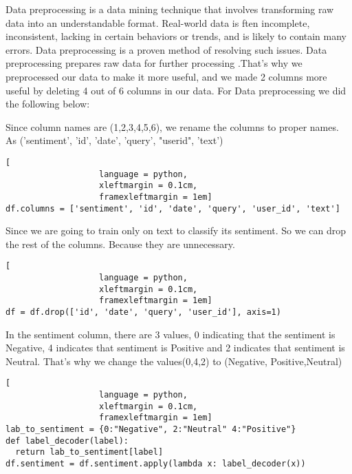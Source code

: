 

Data preprocessing is a data mining technique that involves transforming raw data into an understandable format. Real-world data is ften incomplete, inconsistent, lacking in certain behaviors or trends, and is likely to contain many errors. Data preprocessing is a proven method of resolving such issues. Data preprocessing prepares raw data for further processing .That's why we preprocessed our data to make it more useful, and we made 2 columns more useful by deleting 4 out of 6 columns in our data.
For Data preprocessing we did the following below:


Since column names are (1,2,3,4,5,6), we rename the columns to proper names. As ('sentiment', 'id', 'date', 'query', "userid", 'text')

\begin{lstlisting}[
                   language = python,
                   xleftmargin = 0.1cm,
                   framexleftmargin = 1em]
df.columns = ['sentiment', 'id', 'date', 'query', 'user_id', 'text']
\end{lstlisting}

Since we are going to train only on text to classify its sentiment. So we can drop the rest of the columns. Because they are unnecessary.

\begin{lstlisting}[
                   language = python,
                   xleftmargin = 0.1cm,
                   framexleftmargin = 1em]
df = df.drop(['id', 'date', 'query', 'user_id'], axis=1)
\end{lstlisting}

In the sentiment column, there are 3 values, 0 indicating that the sentiment is Negative, 4 indicates that sentiment is Positive and 2 indicates that sentiment is Neutral. That's why we change the values(0,4,2) to (Negative, Positive,Neutral)
\begin{lstlisting}[
                   language = python,
                   xleftmargin = 0.1cm,
                   framexleftmargin = 1em]
lab_to_sentiment = {0:"Negative", 2:"Neutral" 4:"Positive"}
def label_decoder(label):
  return lab_to_sentiment[label]
df.sentiment = df.sentiment.apply(lambda x: label_decoder(x))
\end{lstlisting}
